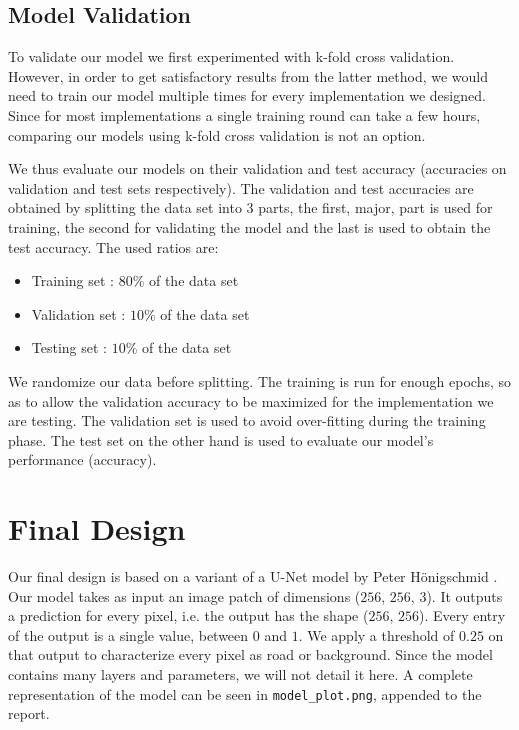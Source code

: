 \documentclass[10pt,conference,compsocconf]{IEEEtran}
\begin{document}
\subsection{Model Validation} 
\label{ssec:model_validation}

To validate our model we first experimented with k-fold cross validation. However, in order to get satisfactory results from the latter method, we would need to train our model multiple times for every implementation we designed. Since for most implementations a single training round can take a few hours, comparing our models using k-fold cross validation is not an option.

We thus evaluate our models on their validation and test accuracy (accuracies on validation and test sets respectively). The validation and test accuracies are obtained by splitting the data set into 3 parts, the first, major, part is used for training, the second for validating the model and the last is used to obtain the test accuracy. The used ratios are: 
\begin{itemize}
	\item Training set : $80\%$ of the data set
	\item Validation set : $10\%$ of the data set
	\item Testing set : $10\%$ of the data set
\end{itemize}
We randomize our data before splitting. The training is run for enough epochs, so as to allow the validation accuracy to be maximized for the implementation we are testing. The validation set is used to avoid over-fitting during the training phase. The test set on the other hand is used to evaluate our model's performance (accuracy).

\section{Final Design}
\label{sec:final}

Our final design is based on a variant of a U-Net model by Peter Hönigschmid \cite{unet}. Our model takes as input an image patch of dimensions ($256$, $256$, $3$). It outputs a prediction for every pixel, i.e. the output has the shape ($256$, $256$). Every entry of the output is a single value, between $0$ and $1$. We apply a threshold of $0.25$ on that output to characterize every pixel as road or background. Since the model contains many layers and parameters, we will not detail it here. A complete representation of the model can be seen in \texttt{model\_plot.png}, appended to the report. 
\end{document}
